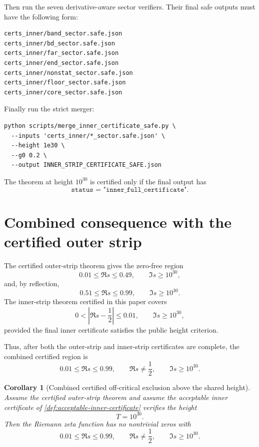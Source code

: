 \documentclass[11pt]{article}
\newtheorem{corollary}[theorem]{Corollary}
\begin{document}
Then run the seven derivative-aware sector verifiers.  Their final safe outputs
must have the following form:
\begin{verbatim}
certs_inner/band_sector.safe.json
certs_inner/bd_sector.safe.json
certs_inner/far_sector.safe.json
certs_inner/end_sector.safe.json
certs_inner/nonstat_sector.safe.json
certs_inner/floor_sector.safe.json
certs_inner/core_sector.safe.json
\end{verbatim}

Finally run the strict merger:
\begin{verbatim}
python scripts/merge_inner_certificate_safe.py \
  --inputs 'certs_inner/*_sector.safe.json' \
  --height 1e30 \
  --g0 0.2 \
  --output INNER_STRIP_CERTIFICATE_SAFE.json
\end{verbatim}

The theorem at height \(10^{30}\) is certified only if the final output has
\[
        \texttt{status = "inner\_full\_certificate"}.
\]



\section{Combined consequence with the certified outer strip}
\label{sec:combined-consequence}

The certified outer-strip theorem gives the zero-free region
\[
        0.01\le\Re s\le0.49,
        \qquad
        \Im s\ge10^{30},
\]
and, by reflection,
\[
        0.51\le\Re s\le0.99,
        \qquad
        \Im s\ge10^{30}.
\]
The inner-strip theorem certified in this paper covers
\[
        0<\left|\Re s-\frac12\right|\le0.01,
        \qquad
        \Im s\ge10^{30},
\]
provided the final inner certificate satisfies the public height criterion.

Thus, after both the outer-strip and inner-strip certificates are complete, the
combined certified region is
\[
        0.01\le\Re s\le0.99,
        \qquad
        \Re s\ne\frac12,
        \qquad
        \Im s\ge10^{30}.
\]

\begin{corollary}[Combined certified off-critical exclusion above the shared height]
\label{cor:combined-off-critical-exclusion}
Assume the certified outer-strip theorem and assume the acceptable inner
certificate of \cref{def:acceptable-inner-certificate} verifies the height
\[
        T=10^{30}.
\]
Then the Riemann zeta function has no nontrivial zeros with
\[
        0.01\le\Re s\le0.99,
        \qquad
        \Re s\ne\frac12,
        \qquad
        \Im s\ge10^{30}.
\]
\end{corollary}
\end{document}
